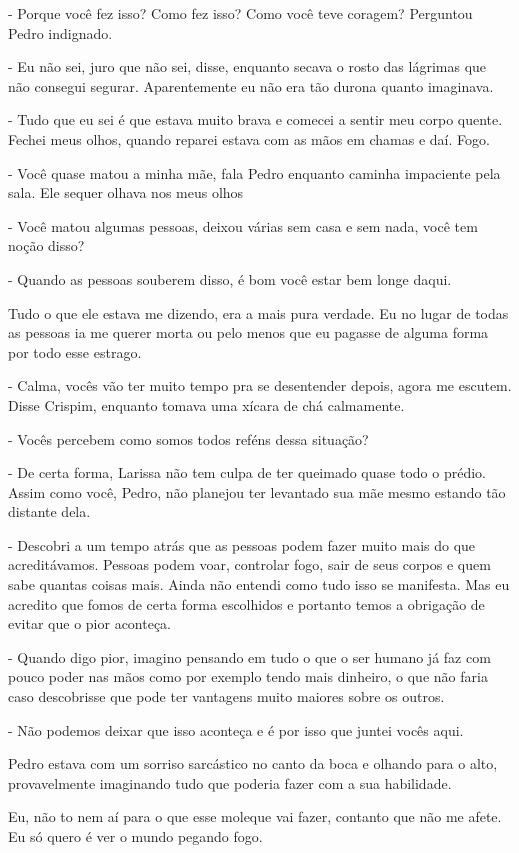 - Porque você fez isso? Como fez isso? Como você teve coragem? Perguntou Pedro indignado.

- Eu não sei, juro que não sei, disse, enquanto secava o rosto das lágrimas que não consegui segurar. Aparentemente eu não era tão durona quanto imaginava.

- Tudo que eu sei é que estava muito brava e comecei a sentir meu corpo quente. Fechei meus olhos, quando reparei estava com as mãos em chamas e daí. Fogo.

- Você quase matou a minha mãe, fala Pedro enquanto caminha impaciente pela sala. Ele sequer olhava nos meus olhos

- Você matou algumas pessoas, deixou várias sem casa e sem nada, você tem noção disso?

- Quando as pessoas souberem disso, é bom você estar bem longe daqui.

Tudo o que ele estava me dizendo, era a mais pura verdade. Eu no lugar de todas as pessoas ia me querer morta ou pelo menos que eu pagasse de alguma forma por todo esse estrago.

- Calma, vocês vão ter muito tempo pra se desentender depois, agora me escutem. Disse Crispim, enquanto tomava uma xícara de chá calmamente. 

- Vocês percebem como somos todos reféns dessa situação? 

- De certa forma, Larissa não tem culpa de ter queimado quase todo o prédio. Assim como você, Pedro, não planejou ter levantado sua mãe mesmo estando tão distante dela.

- Descobri a um tempo atrás que as pessoas podem fazer muito mais do que acreditávamos. Pessoas podem voar, controlar fogo, sair de seus corpos e quem sabe quantas coisas mais. Ainda não entendi como tudo isso se manifesta. Mas eu acredito que fomos de certa forma escolhidos e portanto temos a obrigação de evitar que o pior aconteça.

- Quando digo pior, imagino pensando em tudo o que o ser humano já faz com pouco poder nas mãos como por exemplo tendo mais dinheiro, o que não faria caso descobrisse que pode ter vantagens muito maiores sobre os outros.

- Não podemos deixar que isso aconteça e é por isso que juntei vocês aqui.

Pedro estava com um sorriso sarcástico no canto da boca e olhando para o alto, provavelmente imaginando tudo que poderia fazer com a sua habilidade.

Eu, não to nem aí para o que esse moleque vai fazer, contanto que não me afete. Eu só quero é ver o mundo pegando fogo.

